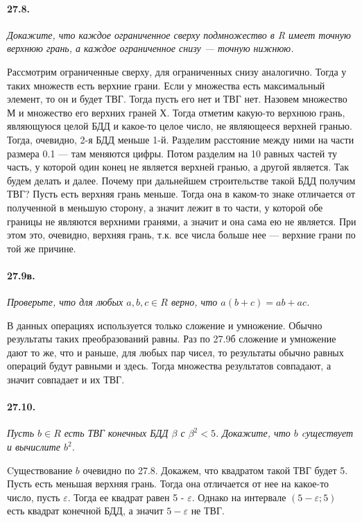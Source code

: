 \documentclass{book}
\begin{document}
\paragraph{27.8.}
\textit{Докажите, что каждое ограниченное сверху подмножество в R имеет точную верхнюю грань, а каждое ограниченное снизу — точную нижнюю.}

Рассмотрим ограниченные сверху, для ограниченных снизу аналогично. Тогда у таких множеств есть верхние грани. Если у множества есть максимальный элемент, то он и будет ТВГ. Тогда пусть его нет и ТВГ нет. Назовем множество М и множество его верхних граней Х. Тогда отметим какую-то верхнюю грань, являющуюся целой БДД и какое-то целое число, не являющееся верхней гранью. Тогда, очевидно, 2-я БДД меньше 1-й. Разделим расстояние между ними на части размера 0.1 — там меняются цифры. Потом разделим на 10 равных частей ту часть, у которой один конец не является верхней гранью, а другой является. Так будем делать и далее. Почему при дальнейшем строительстве такой БДД получим ТВГ? Пусть есть верхняя грань меньше. Тогда она в каком-то знаке отличается от полученной в меньшую сторону, а значит лежит в то части, у которой обе границы не являются верхними гранями, а значит и она сама ею не является. При этом это, очевидно, верхняя грань, т.к. все числа больше нее — верхние грани по той же причине. 

\paragraph{27.9в.}
\textit{Проверьте, что для любых $a, b, c \in R$ верно, что $a(b + c) = ab + ac$.}

В данных операциях используется только сложение и умножение. Обычно результаты таких преобразований равны. Раз по 27.9б сложение и умножение дают то же, что и раньше, для любых пар чисел, то результаты обычно равных операций будут равными и здесь. Тогда множества результатов совпадают, а значит совпадает и их ТВГ.


\paragraph{27.10.}
\textit{Пусть $b \in R$ есть ТВГ конечных БДД $\beta$ с $\beta^2 < 5$. Докажите, что $b$ cуществует и вычислите $b^2$.}

Cуществование $b$ очевидно по 27.8. Докажем, что квадратом такой ТВГ будет 5. Пусть есть меньшая верхняя грань. Тогда она отличается от нее на какое-то число, пусть $\varepsilon$. Тогда ее квадрат равен 5 - $\varepsilon$. Однако на интервале $(5 - \varepsilon; 5)$ есть квадрат конечной БДД, а значит $5 - \varepsilon$ не ТВГ.
\end{document}
